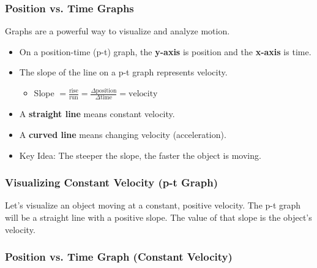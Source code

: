 \documentclass{beamer}
\begin{document}
\begin{frame}
\frametitle{Position vs. Time Graphs}
Graphs are a powerful way to visualize and analyze motion.
\pause
\begin{itemize}
    \item On a position-time (p-t) graph, the \textbf{y-axis} is position and the \textbf{x-axis} is time.
    \pause
    \item The \alert{slope} of the line on a p-t graph represents \alert{velocity}.
    \pause
    \begin{itemize}
        \item Slope $= \frac{\text{rise}}{\text{run}} = \frac{\Delta \text{position}}{\Delta \text{time}} = \text{velocity}$
    \end{itemize}
    \pause
    \item A \textbf{straight line} means constant velocity.
    \pause
    \item A \textbf{curved line} means changing velocity (acceleration).
    \pause
    \item \alert{Key Idea:} The steeper the slope, the faster the object is moving.
\end{itemize}
\end{frame}

\begin{frame}
\frametitle{Visualizing Constant Velocity (p-t Graph)}
Let's visualize an object moving at a constant, positive velocity. The p-t graph will be a straight line with a positive slope. The value of that slope is the object's velocity.
\end{frame}

\begin{frame}
\frametitle{Position vs. Time Graph (Constant Velocity)}
\begin{figure}
\end{figure}
\end{frame}
\end{document}
